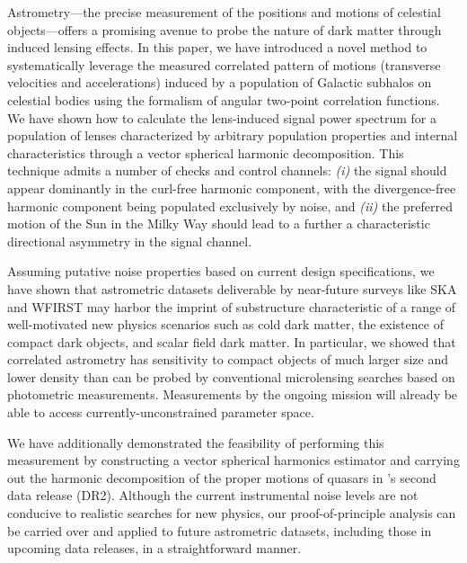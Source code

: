 \documentclass[prd,aps,twocolumn,nofootinbib,superscriptaddress,preprintnumbers,balancelastpage,longbibliography,floatfix]{revtex4-1}
\begin{document}
Astrometry---the precise measurement of the positions and motions of celestial objects---offers a promising avenue to probe the nature of dark matter through induced lensing effects. In this paper, we have introduced a novel method to systematically leverage the measured correlated pattern of motions (transverse velocities and accelerations) induced by a population of Galactic subhalos on celestial bodies using the formalism of angular two-point correlation functions. We have shown how to calculate the lens-induced signal power spectrum for a population of lenses characterized by arbitrary population properties and internal characteristics through a vector spherical harmonic decomposition. This technique admits a number of checks and control channels: \emph{(i)} the signal should appear dominantly in the curl-free harmonic component, with the divergence-free harmonic component being populated exclusively by noise, and \emph{(ii)} the preferred motion of the Sun in the Milky Way should lead to a further a characteristic directional asymmetry in the signal channel.

Assuming putative noise properties based on current design specifications, we have shown that astrometric datasets deliverable by near-future surveys like SKA and WFIRST may harbor the imprint of substructure characteristic of a range of well-motivated new physics scenarios such as cold dark matter, the existence of compact dark objects, and scalar field dark matter. In particular, we showed that correlated astrometry has sensitivity to compact objects of much larger size and lower density than can be probed by conventional microlensing searches based on photometric measurements. Measurements by the ongoing \Gaia mission will already be able to access currently-unconstrained parameter space.

We have additionally demonstrated the feasibility of performing this measurement by constructing a vector spherical harmonics estimator and carrying out the harmonic decomposition of the proper motions of quasars in \Gaia's second data release (DR2). Although the current instrumental noise levels are not conducive to realistic searches for new physics, our proof-of-principle analysis can be carried over and applied to future astrometric datasets, including those in upcoming \Gaia data releases, in a straightforward manner.
\end{document}
